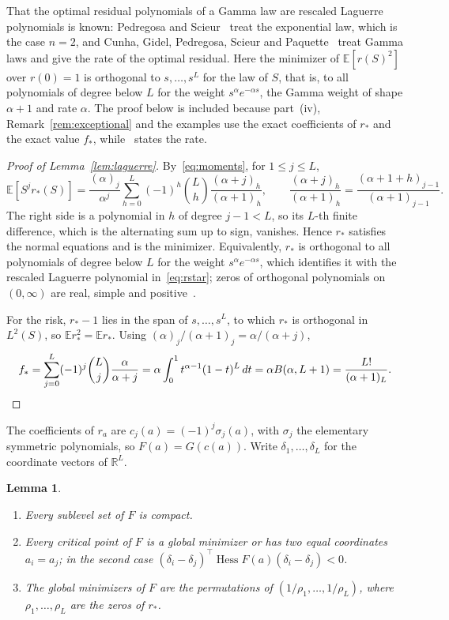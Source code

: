\documentclass[11pt]{amsart}
\newtheorem{lemma}[theorem]{Lemma}
\theoremstyle{remark}
\numberwithin{equation}{section}
\newcommand{\EE}{\mathbb{E}}
\newcommand{\RR}{\mathbb{R}}
\DeclareMathOperator{\Hess}{Hess}
\begin{document}
That the optimal residual polynomials of a Gamma law are rescaled Laguerre polynomials is known: Pedregosa and Scieur~\cite{PS} treat the exponential law, which is the case $n=2$, and Cunha, Gidel, Pedregosa, Scieur and Paquette~\cite[Theorem~4.6]{CGPSP} treat Gamma laws and give the rate of the optimal residual. Here the minimizer of $\EE[r(S)^2]$ over $r(0)=1$ is orthogonal to $s,\dots,s^L$ for the law of $S$, that is, to all polynomials of degree below $L$ for the weight $s^{\alpha}e^{-\alpha s}$, the Gamma weight of shape $\alpha+1$ and rate $\alpha$. The proof below is included because part~(iv), Remark~\ref{rem:exceptional} and the examples use the exact coefficients of $r_*$ and the exact value $f_*$, while~\cite{CGPSP} states the rate.

\begin{proof}[Proof of Lemma~\ref{lem:laguerre}]
By~\eqref{eq:moments}, for $1\le j\le L$,
\[
\EE[S^jr_*(S)]=\frac{(\alpha)_j}{\alpha^j}\sum_{h=0}^{L}(-1)^h\binom Lh\frac{(\alpha+j)_h}{(\alpha+1)_h},
\qquad \frac{(\alpha+j)_h}{(\alpha+1)_h}=\frac{(\alpha+1+h)_{j-1}}{(\alpha+1)_{j-1}}.
\]
The right side is a polynomial in $h$ of degree $j-1<L$, so its $L$-th finite difference, which is the alternating sum up to sign, vanishes. Hence $r_*$ satisfies the normal equations and is the minimizer. Equivalently, $r_*$ is orthogonal to all polynomials of degree below $L$ for the weight $s^{\alpha}e^{-\alpha s}$, which identifies it with the rescaled Laguerre polynomial in~\eqref{eq:rstar}; zeros of orthogonal polynomials on $(0,\infty)$ are real, simple and positive~\cite[Theorem~3.3.1]{Szego}.

For the risk, $r_*-1$ lies in the span of $s,\dots,s^L$, to which $r_*$ is orthogonal in $L^2(S)$, so $\EE r_*^2=\EE r_*$. Using $(\alpha)_j/(\alpha+1)_j=\alpha/(\alpha+j)$,
\[
f_*=\sum_{j=0}^{L}(-1)^j\binom Lj\frac{\alpha}{\alpha+j}=\alpha\int_0^1t^{\alpha-1}(1-t)^L\,dt=\alpha B(\alpha,L+1)=\frac{L!}{(\alpha+1)_L}.\qedhere
\]
\end{proof}

The coefficients of $r_a$ are $c_j(a)=(-1)^j\sigma_j(a)$, with $\sigma_j$ the elementary symmetric polynomials, so $F(a)=G(c(a))$. Write $\delta_1,\dots,\delta_L$ for the coordinate vectors of $\RR^L$.

\begin{lemma}\label{lem:Fland}
\begin{enumerate}[label=\textup{(\alph*)}]
\item Every sublevel set of $F$ is compact.
\item Every critical point of $F$ is a global minimizer or has two equal coordinates $a_i=a_j$; in the second case $(\delta_i-\delta_j)^{\top}\Hess F(a)(\delta_i-\delta_j)<0$.
\item The global minimizers of $F$ are the permutations of $(1/\rho_1,\dots,1/\rho_L)$, where $\rho_1,\dots,\rho_L$ are the zeros of $r_*$.
\end{enumerate}
\end{lemma}
\end{document}

